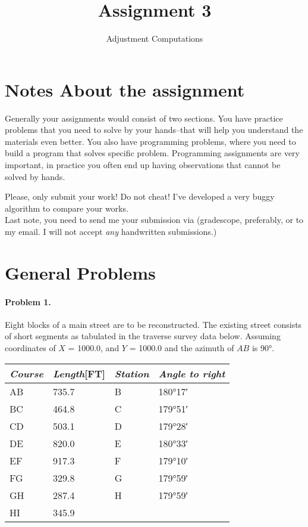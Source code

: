 \documentclass[]{scrartcl}
\title{Assignment 3}
\author{Adjustment Computations}
\begin{document}
\maketitle

\section*{Notes About the assignment}
Generally your assignments would consist of two sections. You have practice problems that you need to solve by your hands--that will help you understand the materials even better. You also have programming problems, where you need to build a program that solves specific problem. Programming assignments are very important, in practice you often end up having observations that cannot be solved by hands.

Please, only submit your work! Do not cheat! I've developed a very buggy algorithm to compare your works.
\\
Last note, you need to send me your submission via (gradescope, preferably, or to my email. I will not accept \textit{any} handwritten submissions.)

\section{General Problems}
\paragraph{Problem 1.}
Eight blocks of a main street are to be reconstructed. The existing street consists of short segments as tabulated in the traverse survey data below. Assuming coordinates of $X$ = 1000.0, and $Y$ = 1000.0 and the azimuth of $AB$ is \ang{90}. 
\begin{table}[]
	\centering
	\label{table:table-1}
	\begin{tabular}{@{}llll@{}}
		\toprule
		\emph{Course} & \emph{Length}[FT]  & \emph{Station} & \emph{Angle to right}\\
		\midrule
		AB & 735.7 & B & \ang{180;17;}\\
		BC & 464.8 & C & \ang{179;51;}\\
		CD & 503.1 & D & \ang{179;28;}\\
		DE & 820.0 & E & \ang{180;33;}\\
		EF & 917.3 & F & \ang{179;10;}\\
		FG & 329.8 & G & \ang{179;59;}\\
		GH & 287.4 & H & \ang{179;59;}\\
		HI & 345.9 &  & \\
		\bottomrule
	\end{tabular}
\end{table}
\end{document}
